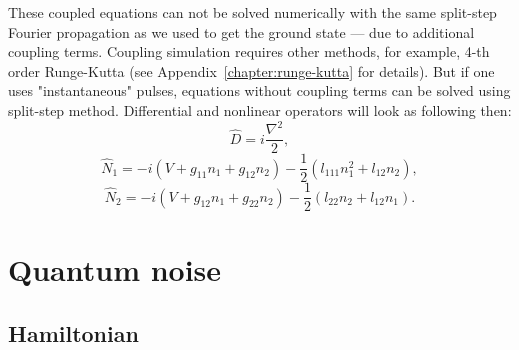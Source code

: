 \documentclass[12pt,notitlepage]{report}
\begin{document}
These coupled equations can not be solved numerically with the same split-step Fourier propagation as we used to get the ground state ---
due to additional coupling terms.
Coupling simulation requires other methods, for example, 4-th order Runge-Kutta
(see Appendix~\ref{chapter:runge-kutta} for details).
But if one uses "instantaneous" pulses, equations without coupling terms can be solved using split-step method.
Differential and nonlinear operators will look as following then:
\[ \hat{D} = i \frac{\nabla^2}{2}, \]
\[ \hat{N}_1 = -i \left( V + g_{11} n_1 + g_{12} n_2 \right) - \frac{1}{2} \left( l_{111} n_1^2 + l_{12} n_2 \right), \]
\[
\hat{N}_2 = -i \left( V + g_{12} n_1 + g_{22} n_2 \right) -
\frac{1}{2} \left( l_{22} n_2 + l_{12} n_1 \right).
\]

\chapter{Quantum noise}

\section{Hamiltonian}
\end{document}
